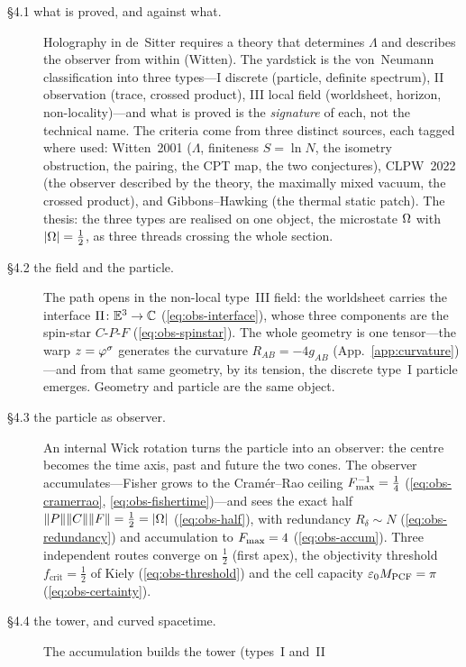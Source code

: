 \begin{description}
  \item[\S4.1 what is proved, and against what.] Holography in de~Sitter requires a theory that
        determines $\Lambda$ and describes the observer from within (Witten). The yardstick is the
        von~Neumann classification into three types---I discrete (particle, definite spectrum), II
        observation (trace, crossed product), III local field (worldsheet, horizon,
        non-locality)---and what is proved is the \emph{signature} of each, not the technical name.
        The criteria come from three distinct sources, each tagged where used: Witten~2001
        ($\Lambda$, finiteness $S=\ln N$, the isometry obstruction, the pairing, the CPT map, the
        two conjectures), CLPW~2022 (the observer described by the theory, the maximally mixed
        vacuum, the crossed product), and Gibbons--Hawking (the thermal static patch). The thesis:
        the three types are realised on one object, the microstate $\Omega$ with $|\Omega|=\tfrac12$, as
        three threads crossing the whole section.
  \item[\S4.2 the field and the particle.] The path opens in the non-local type~III field:
        the worldsheet carries the interface $\Pi\colon\mathbb{E}^3\to\mathbb{C}$ (\eqref{eq:obs-interface}),
        whose three components are the spin-star $C$-$P$-$F$ (\eqref{eq:obs-spinstar}). The whole
        geometry is one tensor---the warp $z=\varphi^\sigma$ generates the curvature
        $R_{AB}={-}4g_{AB}$ (App.~\ref{app:curvature})---and from that same geometry, by its
        tension, the discrete type~I particle emerges. Geometry and particle are the same object.
  \item[\S4.3 the particle as observer.] An internal Wick rotation turns the particle into an
        observer: the centre becomes the time axis, past and future the two cones. The observer
        accumulates---Fisher grows to the Cram\'er--Rao ceiling $F_{\max}^{-1}=\tfrac14$
        (\eqref{eq:obs-cramerrao}, \eqref{eq:obs-fishertime})---and sees the exact half
        $\|P\|\|C\|\|F\|=\tfrac12=|\Omega|$ (\eqref{eq:obs-half}), with redundancy $R_\delta\sim N$
        (\eqref{eq:obs-redundancy}) and accumulation to $F_{\max}=4$ (\eqref{eq:obs-accum}). Three
        independent routes converge on $\tfrac12$ (first apex), the objectivity threshold
        $f_{\mathrm{crit}}=\tfrac12$ of Kiely (\eqref{eq:obs-threshold}) and the cell capacity
        $\varepsilon_{0}M_{\mathrm{PCF}}=\pi$ (\eqref{eq:obs-certainty}).
  \item[\S4.4 the tower, and curved spacetime.] The accumulation builds the tower (types~I and~II

\end{description}
